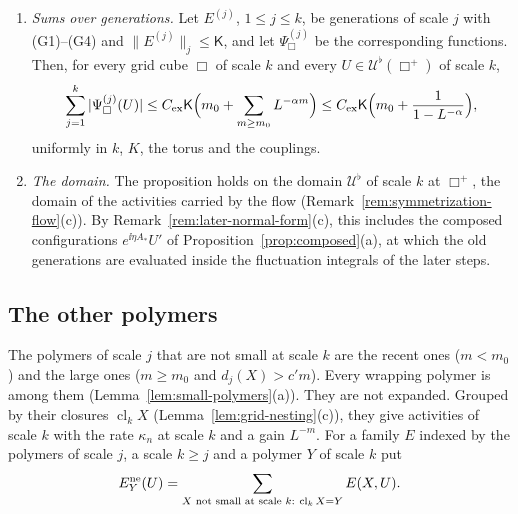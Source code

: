 \begin{remark}
\begin{enumerate}[label=(\alph*)]
\item \emph{Sums over generations.} Let $E^{(j)}$, $1\le j\le k$, be generations of scale $j$ with (G1)--(G4) and $\|E^{(j)}\|_j\le\mathsf K$, and let $\Psi^{(j)}_\Box$ be the corresponding functions. Then, for every grid cube $\Box$ of scale $k$ and every $U\in\mathcal U^\flat(\Box^+)$ of scale $k$,
\[
\sum_{j=1}^k|\Psi^{(j)}_\Box(U)|\le C_{\rm ex}\mathsf K\Big(m_0+\sum_{m\ge m_0}L^{-\alpha m}\Big)\le C_{\rm ex}\mathsf K\Big(m_0+\frac1{1-L^{-\alpha}}\Big),
\]
uniformly in $k$, $K$, the torus and the couplings.
\item \emph{The domain.} The proposition holds on the domain $\mathcal U^\flat$ of scale $k$ at $\Box^+$, the domain of the activities carried by the flow (Remark~\ref{rem:symmetrization-flow}(c)). By Remark~\ref{rem:later-normal-form}(c), this includes the composed configurations $e^{\ii\eta A_*}U'$ of Proposition~\ref{prop:composed}(a), at which the old generations are evaluated inside the fluctuation integrals of the later steps.
\end{enumerate}
\end{remark}

\subsection{The other polymers}\label{subsec:extraction-other}

The polymers of scale $j$ that are not small at scale $k$ are the recent ones ($m<m_0$) and the large ones ($m\ge m_0$ and $d_j(X)>c'm$). Every wrapping polymer is among them (Lemma~\ref{lem:small-polymers}(a)). They are not expanded. Grouped by their closures $\operatorname{cl}_kX$ (Lemma~\ref{lem:grid-nesting}(c)), they give activities of scale $k$ with the rate $\kappa_n$ at scale $k$ and a gain $L^{-m}$. For a family $E$ indexed by the polymers of scale $j$, a scale $k\ge j$ and a polymer $Y$ of scale $k$ put
\[
E^{\rm ne}_Y(U)=\sum_{X\text{ not small at scale }k:\ \operatorname{cl}_kX=Y}E(X,U).
\]

